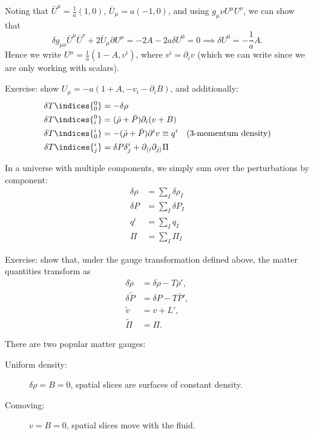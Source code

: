 \documentclass{jknotes}
\begin{document}
Noting that \(\bar{U}^\mu=\frac1a(1,0)\), \(\bar{U}_\mu=a(-1,0)\), and using \(g_\mu\nu U^\mu U^\nu\), we can show that
\begin{equation}
    \delta g_{\mu\nu}\bar{U}^\mu\bar{U}^\nu + 2\bar{U}_\mu\partial U^\mu = -2A - 2a\delta U^0 = 0 \implies \delta U^0= -\frac1a A.
\end{equation}
Hence we write \(U^\mu = \frac1a(1-A,v^i)\), where \(v^i = \partial_i v\) (which we can write since we are only working with scalars).

Exercise: show \(U_\mu=-a(1+A,-v_i-\partial_i B)\), and additionally:
\begin{align}
    \delta T\indices{^0_0} &= -\delta\rho \\
    \delta T\indices{^0_i} &= (\bar\rho + \bar{P})\partial_i(v+B) \\
    \delta T\indices{^i_0} &= -(\bar\rho+ \bar{P})\partial^i v \equiv q^i\quad\text{(3-momentum density)} \\
    \delta T\indices{^i_j} &= \delta P \delta^i_j + \partial_{\langle i}\partial_{j\rangle}\Pi
\end{align}

In a universe with multiple components, we simply sum over the perturbations by component:
\begin{align}
    \delta\rho &= \sum_I\delta\rho_I \\
    \delta P &= \sum_I\delta P_I \\
    q^i &= \sum_I q_I \\
    \Pi &= \sum_I \Pi_I
\end{align}

Exercise: show that, under the gauge transformation defined above, the matter quantities transform as
\begin{align}
    \delta\tilde{\rho} &= \delta\rho - T\bar{\rho}', \\
    \delta\tilde{P} &= \delta P - T\bar{P}', \\
    \tilde{v} &= v + L', \\
    \tilde{\Pi} &= \Pi.
\end{align}

There are two popular matter gauges:
\begin{description}
    \item[Uniform density:] \(\delta\rho = B = 0\), spatial slices are surfaces of constant density.
    \item[Comoving:] \(v=B=0\), spatial slices move with the fluid.
\end{description}
\end{document}

